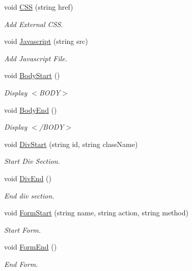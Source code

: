 \begin{DoxyCompactItemize}
void \hyperlink{classHTMLTags_a4e9e18580cc7f2b82c82e4f81e39be50}{C\-S\-S} (string href)
\begin{DoxyCompactList}\small\item\em Add External C\-S\-S. \end{DoxyCompactList}\item 
void \hyperlink{classHTMLTags_aea041d720f12a210615c95350774e6aa}{Javascript} (string src)
\begin{DoxyCompactList}\small\item\em Add Javascript File. \end{DoxyCompactList}\item 
void \hyperlink{classHTMLTags_af1fb7b90b9ebb83177da18aba1ef86a9}{Body\-Start} ()
\begin{DoxyCompactList}\small\item\em Display $<$\-B\-O\-D\-Y$>$ \end{DoxyCompactList}\item 
void \hyperlink{classHTMLTags_a7cae36bd3a0e6f35e89494e5cda64971}{Body\-End} ()
\begin{DoxyCompactList}\small\item\em Display $<$/\-B\-O\-D\-Y$>$ \end{DoxyCompactList}\item 
void \hyperlink{classHTMLTags_a897512b202cfd12729e8fa24e67ea4d6}{Div\-Start} (string id, string class\-Name)
\begin{DoxyCompactList}\small\item\em Start Div Section. \end{DoxyCompactList}\item 
void \hyperlink{classHTMLTags_aa82b2d3d85b3afd29e5641dbe1ace439}{Div\-End} ()
\begin{DoxyCompactList}\small\item\em End div section. \end{DoxyCompactList}\item 
void \hyperlink{classHTMLTags_a1489ccf4629069eca5e550eeb8e8e887}{Form\-Start} (string name, string action, string method)
\begin{DoxyCompactList}\small\item\em Start Form. \end{DoxyCompactList}\item 
void \hyperlink{classHTMLTags_ab57baef28db9590ce59d0e2f403a210f}{Form\-End} ()
\begin{DoxyCompactList}\small\item\em End Form. \end{DoxyCompactList}\item 

\end{DoxyCompactItemize}
